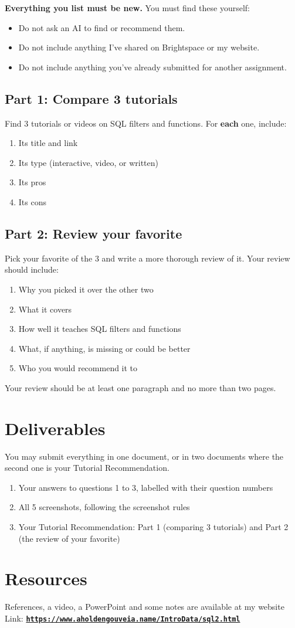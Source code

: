 \documentclass[12pt]{article}
\begin{document}
\textbf{Everything you list must be new.} You must find these yourself:
\begin{itemize}
    \item Do not ask an AI to find or recommend them.
    \item Do not include anything I've shared on Brightspace or my website.
    \item Do not include anything you've already submitted for another assignment.
\end{itemize}

\subsection*{Part 1: Compare 3 tutorials}
Find 3 tutorials or videos on SQL filters and functions. For \textbf{each} one, include:
\begin{enumerate}[label=(\alph*)]
    \item Its title and link
    \item Its type (interactive, video, or written)
    \item Its pros
    \item Its cons
\end{enumerate}

\subsection*{Part 2: Review your favorite}
Pick your favorite of the 3 and write a more thorough review of it. Your review should include:
\begin{enumerate}[label=(\alph*)]
    \item Why you picked it over the other two
    \item What it covers
    \item How well it teaches SQL filters and functions
    \item What, if anything, is missing or could be better
    \item Who you would recommend it to
\end{enumerate}

Your review should be at least one paragraph and no more than two pages.

\section*{Deliverables}
You may submit everything in one document, or in two documents where the second one is your Tutorial Recommendation.
\begin{enumerate}
    \item Your answers to questions 1 to 3, labelled with their question numbers
    \item All 5 screenshots, following the screenshot rules
    \item Your Tutorial Recommendation: Part 1 (comparing 3 tutorials) and Part 2 (the review of your favorite)
\end{enumerate}

\section*{Resources}
References, a video, a PowerPoint and some notes are available at my website
Link: \href{https://www.aholdengouveia.name/IntroData/sql2.html}{\textbf{\nolinkurl{https://www.aholdengouveia.name/IntroData/sql2.html}}}
\end{document}
